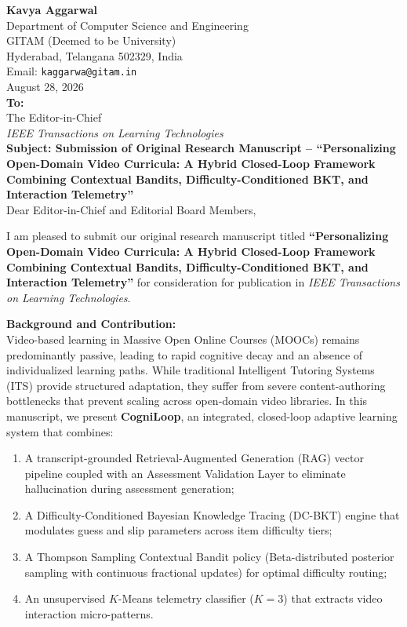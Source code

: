 \documentclass[11pt]{article}
\begin{document}
\thispagestyle{empty}

\noindent
\textbf{Kavya Aggarwal} \\
Department of Computer Science and Engineering \\
GITAM (Deemed to be University) \\
Hyderabad, Telangana 502329, India \\
Email: \texttt{kaggarwa@gitam.in} \\[1.5em]

\noindent
August 28, 2026 \\[1.5em]

\noindent
\textbf{To:} \\
The Editor-in-Chief \\
\textit{IEEE Transactions on Learning Technologies} \\[1.5em]

\noindent
\textbf{Subject: Submission of Original Research Manuscript -- ``Personalizing Open-Domain Video Curricula: A Hybrid Closed-Loop Framework Combining Contextual Bandits, Difficulty-Conditioned BKT, and Interaction Telemetry''} \\[1.2em]

\noindent
Dear Editor-in-Chief and Editorial Board Members,

\vspace{0.8em}
\noindent
I am pleased to submit our original research manuscript titled \textbf{``Personalizing Open-Domain Video Curricula: A Hybrid Closed-Loop Framework Combining Contextual Bandits, Difficulty-Conditioned BKT, and Interaction Telemetry''} for consideration for publication in \textit{IEEE Transactions on Learning Technologies}.

\vspace{0.8em}
\noindent
\textbf{Background and Contribution:} \\
Video-based learning in Massive Open Online Courses (MOOCs) remains predominantly passive, leading to rapid cognitive decay and an absence of individualized learning paths. While traditional Intelligent Tutoring Systems (ITS) provide structured adaptation, they suffer from severe content-authoring bottlenecks that prevent scaling across open-domain video libraries. In this manuscript, we present \textbf{CogniLoop}, an integrated, closed-loop adaptive learning system that combines:
\begin{enumerate}
    \item A transcript-grounded Retrieval-Augmented Generation (RAG) vector pipeline coupled with an Assessment Validation Layer to eliminate hallucination during assessment generation;
    \item A Difficulty-Conditioned Bayesian Knowledge Tracing (DC-BKT) engine that modulates guess and slip parameters across item difficulty tiers;
    \item A Thompson Sampling Contextual Bandit policy (Beta-distributed posterior sampling with continuous fractional updates) for optimal difficulty routing;
    \item An unsupervised $K$-Means telemetry classifier ($K=3$) that extracts video interaction micro-patterns.
\end{enumerate}
\end{document}
